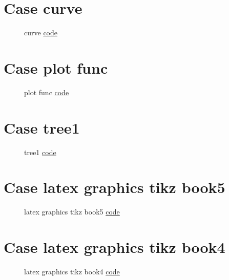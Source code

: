 \documentclass{article}
\begin{document}
\section{Case curve}

\begin{figure}[H]
    \centering
    
    \caption{curve \href{https:/github.com/cauliyang/learn_tikz/blob/main/source/curve.tex}{code} }
    \label{fig:curve}
\end{figure}

\section{Case plot func}

\begin{figure}[H]
    \centering
    
    \caption{plot func \href{https:/github.com/cauliyang/learn_tikz/blob/main/source/plot_func.tex}{code} }
    \label{fig:plot func}
\end{figure}

\section{Case tree1}

\begin{figure}[H]
    \centering
    
    \caption{tree1 \href{https:/github.com/cauliyang/learn_tikz/blob/main/source/tree1.tex}{code} }
    \label{fig:tree1}
\end{figure}

\section{Case latex graphics tikz book5}

\begin{figure}[H]
    \centering
    
    \caption{latex graphics tikz book5 \href{https:/github.com/cauliyang/learn_tikz/blob/main/source/latex_graphics_tikz_book5.tex}{code} }
    \label{fig:latex graphics tikz book5}
\end{figure}

\section{Case latex graphics tikz book4}

\begin{figure}[H]
    \centering
    
    \caption{latex graphics tikz book4 \href{https:/github.com/cauliyang/learn_tikz/blob/main/source/latex_graphics_tikz_book4.tex}{code} }
    \label{fig:latex graphics tikz book4}
\end{figure}
\end{document}
